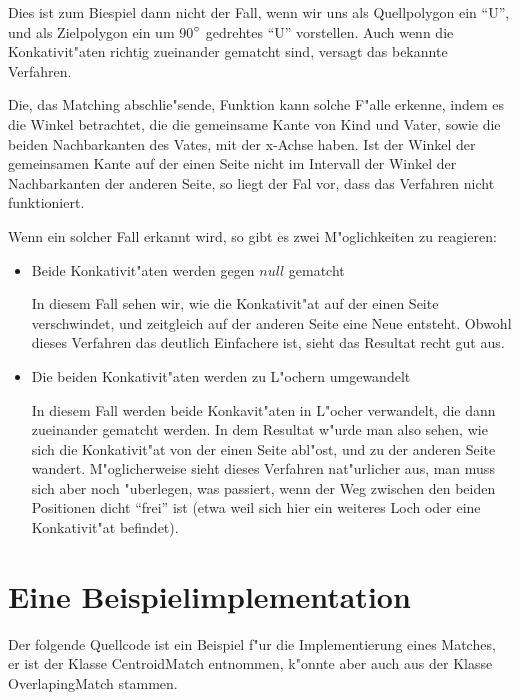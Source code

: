 \documentclass[a4paper,10pt,twoside]{scrreprt}
\begin{document}
Dies ist zum Biespiel dann nicht der Fall, wenn wir uns als Quellpolygon ein "`U"', und als Zielpolygon ein um 90$\degree$ gedrehtes "`U"' vorstellen. Auch wenn die Konkativit"aten richtig zueinander gematcht sind, versagt das bekannte Verfahren.

Die, das Matching abschlie"sende, Funktion kann solche F"alle erkenne, indem es die Winkel betrachtet, die die gemeinsame Kante von Kind und Vater, sowie die beiden Nachbarkanten des Vates, mit der x-Achse haben. Ist der Winkel der gemeinsamen Kante auf der einen Seite nicht im  Intervall der Winkel der Nachbarkanten der anderen Seite, so liegt der Fal vor, dass das Verfahren nicht funktioniert.

Wenn ein solcher Fall erkannt wird, so gibt es zwei M"oglichkeiten zu reagieren:
\begin{itemize}
\item Beide Konkativit"aten werden gegen $null$ gematcht

In diesem Fall sehen wir, wie die Konkativit"at auf der einen Seite verschwindet, und zeitgleich auf der anderen Seite eine Neue entsteht. Obwohl dieses Verfahren das deutlich Einfachere ist, sieht das Resultat recht gut aus.

\item Die beiden Konkativit"aten werden zu L"ochern umgewandelt

In diesem Fall werden beide Konkavit"aten in L"ocher verwandelt, die dann zueinander gematcht werden. In dem Resultat w"urde man also sehen, wie sich die Konkativit"at von der einen Seite abl"ost, und zu der anderen Seite wandert. M"oglicherweise sieht dieses Verfahren nat"urlicher aus, man muss sich aber noch "uberlegen, was passiert, wenn der Weg zwischen den beiden Positionen dicht "`frei"' ist (etwa weil sich hier ein weiteres Loch oder eine Konkativit"at befindet).

\end{itemize}


\section{Eine Beispielimplementation}

Der folgende Quellcode ist ein Beispiel f"ur die Implementierung eines Matches, er ist der Klasse CentroidMatch entnommen, k"onnte aber auch aus der Klasse OverlapingMatch stammen. 
\end{document}
